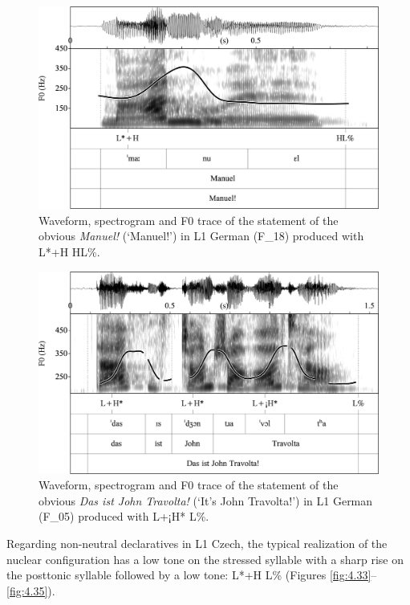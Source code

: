 \begin{figure}
\includegraphics[width=\textwidth]{figures/Figure_4.31.png}
\caption{Waveform, spectrogram and F0 trace of the statement of the obvious \textit{Manuel!} (‘Manuel!’) in L1 German \mbox{(F\_18)} produced with L*+H HL\%.}
\label{fig:4.31}
\end{figure}

\begin{figure}
\includegraphics[width=\textwidth]{figures/Figure_4.32.png}
\caption{Waveform, spectrogram and F0 trace of the statement of the obvious \textit{Das ist John Travolta!} (‘It’s John Travolta!’) in L1 German \mbox{(F\_05)} produced with L+¡H* L\%.}
\label{fig:4.32}
\end{figure}

Regarding non-neutral declaratives in L1 Czech, the typical realization of the nuclear configuration has a low tone on the stressed syllable with a sharp rise on the posttonic syllable followed by a low tone: L*+H L\% (Figures \ref{fig:4.33}--\ref{fig:4.35}).

